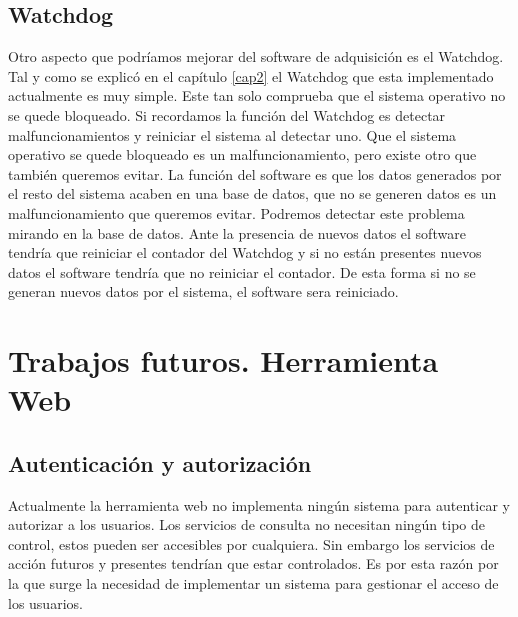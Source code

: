	\subsection{Watchdog}
	Otro aspecto que podríamos mejorar del software de adquisición es el Watchdog. Tal y como se explicó en el capítulo \ref{cap2} el Watchdog que esta
	implementado actualmente es muy simple. Este tan solo comprueba que el sistema operativo no se quede bloqueado. Si recordamos la función del
	Watchdog es detectar malfuncionamientos y reiniciar el sistema al detectar uno. Que el sistema operativo se quede bloqueado es un
	malfuncionamiento, pero existe otro que también queremos evitar. La función del software es que los datos generados por el resto del sistema
	acaben en una base de datos, que no se generen datos es un malfuncionamiento que queremos evitar. Podremos detectar este problema mirando en
	la base de datos. Ante la presencia de nuevos datos el software tendría que reiniciar el contador del Watchdog y si no están presentes nuevos
	datos el software tendría que no reiniciar el contador. De esta forma si no se generan nuevos datos por el sistema, el software sera
	reiniciado.
\section{Trabajos futuros. Herramienta Web}
	\subsection{Autenticación y autorización}
	Actualmente la herramienta web no implementa ningún sistema para autenticar y autorizar a los usuarios. Los servicios de consulta no necesitan
	ningún tipo de control, estos pueden ser accesibles por cualquiera. Sin embargo los servicios de acción futuros y presentes tendrían que estar
	controlados. Es por esta razón por la que surge la necesidad de implementar un sistema para gestionar el acceso de los usuarios. 
